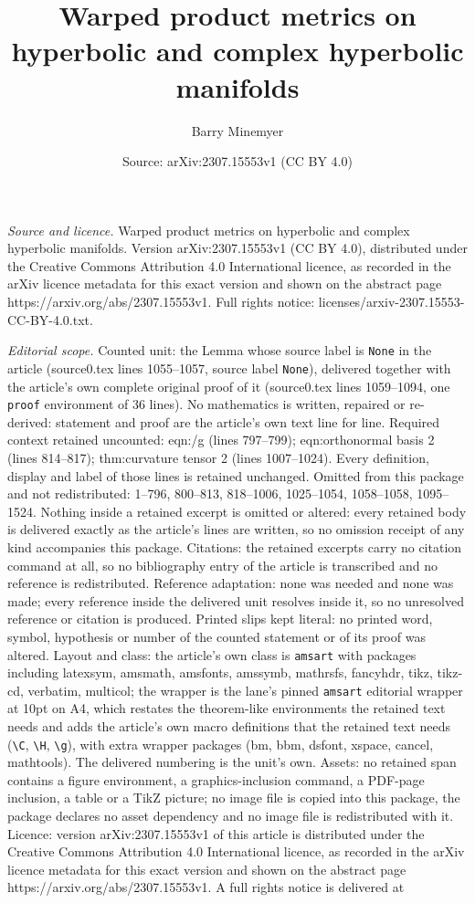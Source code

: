 \documentclass[10pt,a4paper]{amsart}
\title[Warped product metrics on hyperbolic and complex hyperbolic ]{Warped product metrics on hyperbolic and complex hyperbolic manifolds}
\author{Barry Minemyer}
\date{Source: arXiv:2307.15553v1 (CC BY 4.0)}
\begin{document}
\maketitle

\noindent\emph{Source and licence.} Warped product metrics on hyperbolic and complex hyperbolic manifolds. Version arXiv:2307.15553v1 (CC BY 4.0), distributed under the Creative Commons Attribution 4.0 International licence, as recorded in the arXiv licence metadata for this exact version and shown on the abstract page https://arxiv.org/abs/2307.15553v1. Full rights notice: licenses/arxiv-2307.15553-CC-BY-4.0.txt.\par\smallskip

\noindent\textit{Editorial scope.} Counted unit: the Lemma whose source label is \texttt{None} in the article (source0.tex lines 1055--1057, source label \texttt{None}), delivered together with the article's own complete original proof of it (source0.tex lines 1059--1094, one \texttt{proof} environment of 36 lines). No mathematics is written, repaired or re-derived: statement and proof are the article's own text line for line. Required context retained uncounted: eqn:/g (lines 797--799); eqn:orthonormal basis 2 (lines 814--817); thm:curvature tensor 2 (lines 1007--1024). Every definition, display and label of those lines is retained unchanged. Omitted from this package and not redistributed: 1--796, 800--813, 818--1006, 1025--1054, 1058--1058, 1095--1524. Nothing inside a retained excerpt is omitted or altered: every retained body is delivered exactly as the article's lines are written, so no omission receipt of any kind accompanies this package. Citations: the retained excerpts carry no citation command at all, so no bibliography entry of the article is transcribed and no reference is redistributed. Reference adaptation: none was needed and none was made; every reference inside the delivered unit resolves inside it, so no unresolved reference or citation is produced. Printed slips kept literal: no printed word, symbol, hypothesis or number of the counted statement or of its proof was altered. Layout and class: the article's own class is \texttt{amsart} with packages including latexsym, amsmath, amsfonts, amssymb, mathrsfs, fancyhdr, tikz, tikz-cd, verbatim, multicol; the wrapper is the lane's pinned \texttt{amsart} editorial wrapper at 10pt on A4, which restates the theorem-like environments the retained text needs and adds the article's own macro definitions that the retained text needs (\texttt{\textbackslash C}, \texttt{\textbackslash H}, \texttt{\textbackslash g}), with extra wrapper packages (bm, bbm, dsfont, xspace, cancel, mathtools). The delivered numbering is the unit's own. Assets: no retained span contains a figure environment, a graphics-inclusion command, a PDF-page inclusion, a table or a TikZ picture; no image file is copied into this package, the package declares no asset dependency and no image file is redistributed with it. Licence: version arXiv:2307.15553v1 of this article is distributed under the Creative Commons Attribution 4.0 International licence, as recorded in the arXiv licence metadata for this exact version and shown on the abstract page https://arxiv.org/abs/2307.15553v1. A full rights notice is delivered at 
\end{document}
